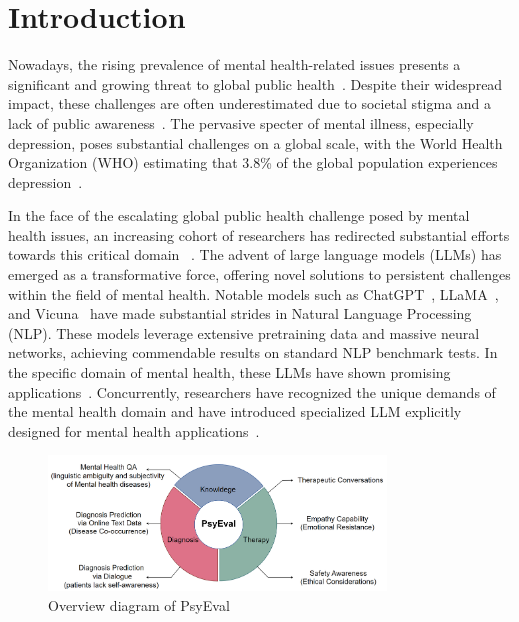 \section{Introduction}
Nowadays, the rising prevalence of mental health-related issues presents a significant and growing threat to global public health~\cite{evans2018socioeconomic}. Despite their widespread impact, these challenges are often underestimated due to societal stigma and a lack of public awareness~\cite{pirina2018identifying}. The pervasive specter of mental illness, especially depression, poses substantial challenges on a global scale, with the World Health Organization (WHO) estimating that 3.8\% of the global population experiences depression~\cite{who2023depression}. 

In the face of the escalating global public health challenge posed by mental health issues, an increasing cohort of researchers has redirected substantial efforts towards this critical domain ~\cite{Lamichhane2023chatgptapp}. The advent of large language models (LLMs) has emerged as a transformative force, offering novel solutions to persistent challenges within the field of mental health. Notable models such as ChatGPT~\cite{schulman2022chatgpt}, LLaMA~\cite{touvron2023llama}, and Vicuna~\cite{chiang2023vicuna} have made substantial strides in Natural Language Processing (NLP). These models leverage extensive pretraining data and massive neural networks, achieving commendable results on standard NLP benchmark tests. In the specific domain of mental health, these LLMs have shown promising applications~\cite{xu2023leveraging, Lamichhane2023chatgptapp}. Concurrently, researchers have recognized the unique demands of the mental health domain and have introduced specialized LLM explicitly designed for mental health applications~\cite{yang2023mentalllama}.

    \begin{figure}[th]
        \centering
        \includegraphics[width=0.8\textwidth]{Figure/PsyEval.png}
        \caption{Overview diagram of PsyEval}
    \end{figure}
    
